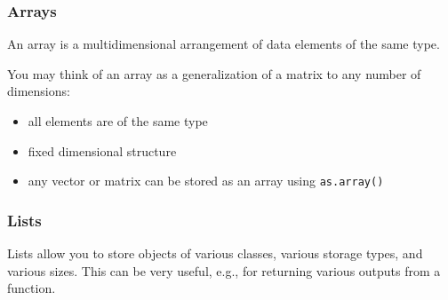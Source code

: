 \documentclass[
  11pt,
]{article}
\newenvironment{Shaded}{\begin{snugshade}}{\end{snugshade}}
\newcommand{\AttributeTok}[1]{\textcolor[rgb]{0.13,0.29,0.53}{#1}}
\newcommand{\DecValTok}[1]{\textcolor[rgb]{0.00,0.00,0.81}{#1}}
\newcommand{\FunctionTok}[1]{\textcolor[rgb]{0.13,0.29,0.53}{\textbf{#1}}}
\newcommand{\NormalTok}[1]{#1}
\newcommand{\OtherTok}[1]{\textcolor[rgb]{0.56,0.35,0.01}{#1}}
\newcommand{\SpecialCharTok}[1]{\textcolor[rgb]{0.81,0.36,0.00}{\textbf{#1}}}
\providecommand{\tightlist}{%
  \setlength{\itemsep}{0pt}\setlength{\parskip}{0pt}}
\begin{document}
\hypertarget{arrays}{%
\subsubsection{Arrays}\label{arrays}}

An array is a multidimensional arrangement of data elements of the same type.

You may think of an array as a generalization of a matrix to any number of dimensions:

\begin{itemize}
\tightlist
\item
  all elements are of the same type
\item
  fixed dimensional structure
\item
  any vector or matrix can be stored as an array using \texttt{as.array()}
\end{itemize}

\hypertarget{lists}{%
\subsubsection{Lists}\label{lists}}

Lists allow you to store objects of various classes, various storage types, and various sizes. This can be very useful, e.g., for returning various outputs from a function.

\begin{Shaded}
\end{Shaded}
\end{document}
